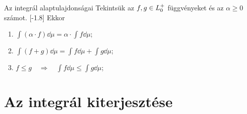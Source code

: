 \documentclass[
]{elteikthesis}[2024/04/26]
\begin{document}
	\begin{theorem}{Az integrál alaptulajdonságai}{}
		Tekintsük az \( f, g \in \StepFuncPos \) függvényeket és az \( \alpha \geq 0 \) számot. 
		[-1.8\baselineskip]
		Ekkor
		\begin{enumerate}
			\item \( \displaystyle \int (\alpha \cdot f) \dd{\mu} = \alpha \cdot \int f \dd{\mu} \);
			\item \( \displaystyle \int (f + g) \dd{\mu} = \int f \dd{\mu} + \int g \dd{\mu} \);
			\item \( \displaystyle f \leq g \quad \Longrightarrow \quad \int f \dd{\mu} \leq \int g \dd{\mu} \);
		\end{enumerate}
	\end{theorem}
	
	\newpage
	\section{Az integrál kiterjesztése}
	
\end{document}
